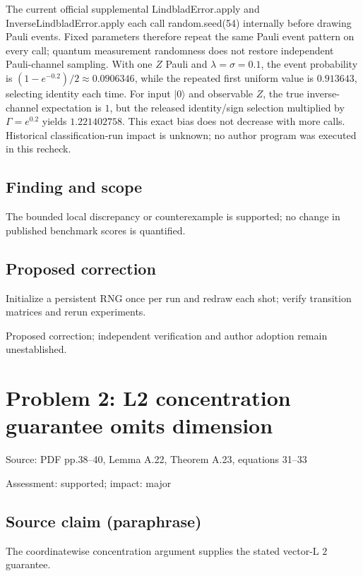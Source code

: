 \documentclass[11pt]{article}
\begin{document}
The current official supplemental LindbladError.apply and InverseLindbladError.apply each call random.seed(54) internally before drawing Pauli events. Fixed parameters therefore repeat the same Pauli event pattern on every call; quantum measurement randomness does not restore independent Pauli-channel sampling. With one \(Z\) Pauli and \(\lambda=\sigma=0.1\), the event probability is \((1-e^{-0.2})/2\approx0.0906346\), while the repeated first uniform value is \(0.913643\), selecting identity each time. For input \(|0\rangle\) and observable \(Z\), the true inverse-channel expectation is \(1\), but the released identity/sign selection multiplied by \(\Gamma=e^{0.2}\) yields \(1.221402758\). This exact bias does not decrease with more calls. Historical classification-run impact is unknown; no author program was executed in this recheck.

\subsection*{Finding and scope}

The bounded local discrepancy or counterexample is supported; no change in published benchmark scores is quantified.

\subsection*{Proposed correction}

Initialize a persistent RNG once per run and redraw each shot; verify transition matrices and rerun experiments.

Proposed correction; independent verification and author adoption remain unestablished.

\section*{Problem 2: L2 concentration guarantee omits dimension}

Source: PDF pp.38–40, Lemma A.22, Theorem A.23, equations 31–33

Assessment: supported; impact: major

\subsection*{Source claim (paraphrase)}

The coordinatewise concentration argument supplies the stated vector-L \(2\) guarantee.
\end{document}
